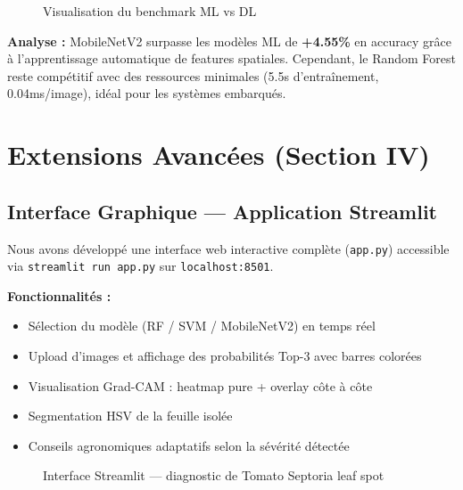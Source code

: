 \documentclass[12pt,a4paper]{article}
\begin{document}
\begin{figure}[H]
\centering
{}
\caption{Visualisation du benchmark ML vs DL}
\end{figure}

\noindent\textbf{Analyse :} MobileNetV2 surpasse les modèles ML de \textbf{+4.55\%} 
en accuracy grâce à l'apprentissage automatique de features spatiales. 
Cependant, le Random Forest reste compétitif avec des ressources minimales 
(5.5s d'entraînement, 0.04ms/image), idéal pour les systèmes embarqués.

\section{Extensions Avancées (Section IV)}

\subsection{Interface Graphique — Application Streamlit}

Nous avons développé une interface web interactive complète (\texttt{app.py}) 
accessible via \texttt{streamlit run app.py} sur \texttt{localhost:8501}.

\textbf{Fonctionnalités :}
\begin{itemize}
  \item Sélection du modèle (RF / SVM / MobileNetV2) en temps réel
  \item Upload d'images et affichage des probabilités Top-3 avec barres colorées
  \item Visualisation Grad-CAM : heatmap pure + overlay côte à côte
  \item Segmentation HSV de la feuille isolée
  \item Conseils agronomiques adaptatifs selon la sévérité détectée
\end{itemize}

\begin{figure}[H]
\centering
{}
\caption{Interface Streamlit — diagnostic de Tomato Septoria leaf spot}
\end{figure}
\end{document}
